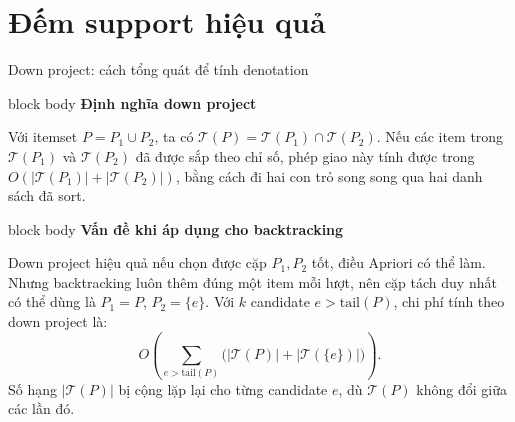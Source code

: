 \documentclass[9pt, aspectratio=169]{beamer}
\newenvironment{quietblock}[1]{%
  \begin{beamercolorbox}[wd=\linewidth,sep=5pt,rounded=true]{block body}
  {\color{psdearblue}\bfseries #1}\par\vspace{2pt}\footnotesize
}{%
  \end{beamercolorbox}
}
\begin{document}
\section{Đếm support hiệu quả}
\begin{frame}{Down project: cách tổng quát để tính denotation}
  \begin{quietblock}{Định nghĩa down project}
    Với itemset $P=P_1\cup P_2$, ta có $\mathcal T(P)=\mathcal T(P_1)\cap
    \mathcal T(P_2)$. Nếu các item trong $\mathcal T(P_1)$ và $\mathcal
    T(P_2)$ đã được sắp theo chỉ số, phép giao này tính được trong
    $O(|\mathcal T(P_1)|+|\mathcal T(P_2)|)$, bằng cách đi hai con trỏ song
    song qua hai danh sách đã sort.
  \end{quietblock}

  \vspace{0.2cm}
  \begin{quietblock}{Vấn đề khi áp dụng cho backtracking}
    Down project hiệu quả nếu chọn được cặp $P_1,P_2$ tốt, điều Apriori có
    thể làm. Nhưng backtracking luôn thêm đúng một item mỗi lượt, nên cặp
    tách duy nhất có thể dùng là $P_1=P$, $P_2=\{e\}$. Với $k$ candidate
    $e>\mathrm{tail}(P)$, chi phí tính theo down project là:
    \[
      O\!\left(\sum_{e>\mathrm{tail}(P)} \bigl(|\mathcal T(P)|+|\mathcal
      T(\{e\})|\bigr)\right).
    \]
    Số hạng $|\mathcal T(P)|$ bị cộng lặp lại cho từng candidate $e$, dù
    $\mathcal T(P)$ không đổi giữa các lần đó.
  \end{quietblock}
\end{frame}
\end{document}
